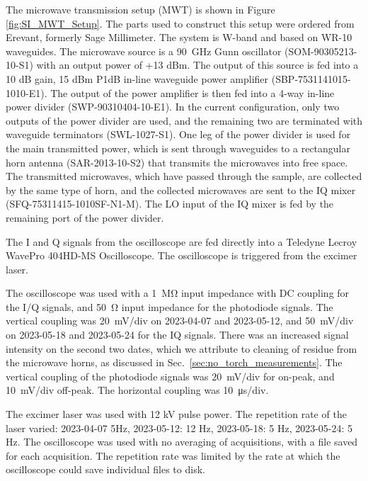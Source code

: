 The microwave transmission setup (MWT) is shown in Figure \ref{fig:SI_MWT_Setup}. The parts used to construct this setup were ordered from Erevant, formerly Sage Millimeter. The system is W-band and based on WR-10 waveguides. The microwave source is a \SI{90} {\giga\hertz} Gunn oscillator (SOM-90305213-10-S1) with an output power of +13 dBm. The output of this source is fed into a 10 dB gain, 15 dBm P1dB in-line waveguide power amplifier (SBP-7531141015-1010-E1). The output of the power amplifier is then fed into a 4-way in-line power divider (SWP-90310404-10-E1). In the current configuration, only two outputs of the power divider are used, and the remaining two are terminated with waveguide terminators (SWL-1027-S1). One leg of the power divider is used for the main transmitted power, which is sent through waveguides to a rectangular horn antenna (SAR-2013-10-S2) that transmits the microwaves into free space. The transmitted microwaves, which have passed through the sample, are collected by the same type of horn, and the collected microwaves are sent to the IQ mixer (SFQ-75311415-1010SF-N1-M). The LO input of the IQ mixer is fed by the remaining port of the power divider. 


The I and Q signals from the oscilloscope are fed directly into a Teledyne Lecroy WavePro 404HD-MS Oscilloscope.  The oscilloscope is triggered from the excimer laser. 

The oscilloscope was used with a \SI{1} {\mega\ohm} input impedance with DC coupling for the I/Q signals, and \SI{50} {\ohm} input impedance for the photodiode signals. The vertical coupling was \SI{20} {\milli\volt/div} on 2023-04-07 and 2023-05-12, and \SI{50} {\milli\volt/div} on 2023-05-18 and 2023-05-24 for the IQ signals. There was an increased signal intensity on the second two dates, which we attribute to cleaning of residue from the microwave horns, as discussed in Sec.\ \ref{sec:no_torch_measurements}. The vertical coupling of the photodiode signals was \SI{20} {\milli\volt/div} for on-peak, and \SI{10} {\milli\volt/div} off-peak. The horizontal coupling was \SI{10} {\micro\second/div}.

The excimer laser was used with 12 kV pulse power. The repetition rate of the laser varied: 2023-04-07 5Hz, 2023-05-12: 12 Hz, 2023-05-18: 5 Hz, 2023-05-24: 5 Hz. The oscilloscope was used with no averaging of acquisitions, with a file saved for each acquisition. The repetition rate was limited by the rate at which the oscilloscope could save individual files to disk. 

